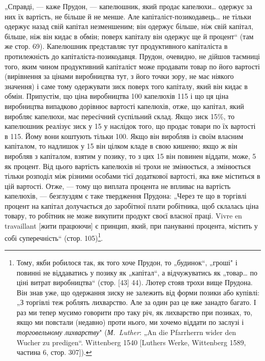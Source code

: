 „Справді, — каже Прудон, — капелюшник, який продає капелюхи\dots{}
одержує за них їх вартість, не більше й не менше. Але
капіталіст-позикодавець\dots{} не тільки одержує назад свій капітал
незменшеним; він одержує більше, ніж свій капітал, більше, ніж
він кидає в обмін; поверх капіталу він одержує ще й процент“
(там же стор. 69). Капелюшник представляє тут продуктивного
капіталіста в протилежність до капіталіста-позикодавця.
Прудон, очевидно, не дійшов таємниці того, яким чином продуктивний
капіталіст може продавати товар по його вартості (вирівнення
за цінами виробництва тут, з його точки зору, не має
ніякого значення) і саме тому одержувати зиск поверх того капіталу,
який він кидає в обмін. Припустім, що ціна виробництва
100 капелюхів \deq{} 115 і що ця ціна виробництва
випадково дорівнює вартості капелюхів, отже, що капітал,
який виробляє капелюхи, має пересічний суспільний склад.
Якщо зиск \deq{} 15\%, то капелюшник реалізує зиск у 15
у наслідок того, що продає товари по їх вартості в 115.
Йому вони коштують тільки 100. Якщо він
виробляв із своїм власним капіталом, то надлишок у 15 він цілком кладе в свою кишеню; якщо ж він виробляв
з капіталом, взятим у позику, то з цих 15
він повинен віддати, може, 5 як процент.
Від цього вартість капелюхів ні трохи не змінюється, а змінюється
тільки розподіл між різними особами тієї додаткової
вартості, яка вже міститься в цій вартості. Отже, — тому що
виплата процента не впливає на вартість капелюхів, — безглуздям
є таке твердження Прудона: „Через те що в торгівлі процент
на капітал долучається до заробітної плати робітника, щоб склалась
ціна товару, то робітник не може викупити продукт своєї
власної праці. Vivre en travaillant [жити працюючи] є принцип,
який, при пануванні процента, містить у собі суперечність“
(стор. 105)\footnote{
Тому, якби робилося так, як того хоче Прудон, то „будинок“, „гроші"
і~ повинні не віддаватись у позику як „капітал“, а відчужуватись як „товар\dots{}
по ціні витрат виробництва“ (стор. [43] 44). Лютер стояв трохи вище
Прудона. Він знав уже, що одержання зиску не залежить від форми позики
або купівлі: „З торгівлі теж роблять лихварство. Але за один раз це вже занадто
багато. І раз ми тепер мусимо говорити про таку річ, як лихварство
при позиках, то, якщо ми повстали (недавно) проти нього, ми хочемо віддати
по заслузі і \emph{торговельному лихварству}" (\emph{М.~Luther}: „An die Pfarrherrn wider
den Wucher zu predigen“. Wittenberg 1540 [Luthers Werke, Wittenberg 1589, частина
6, стор. 307]).
}.

